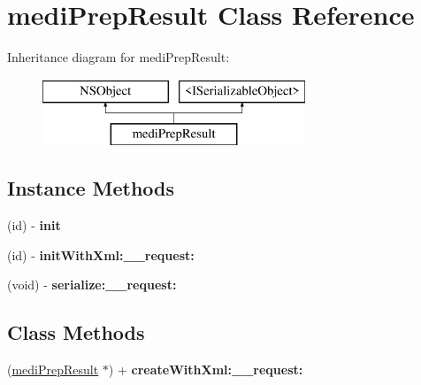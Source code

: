 \hypertarget{interfacemedi_prep_result}{}\section{medi\+Prep\+Result Class Reference}
\label{interfacemedi_prep_result}
Inheritance diagram for medi\+Prep\+Result\+:\begin{figure}[H]
\begin{center}
\leavevmode
\includegraphics[height=2.000000cm]{interfacemedi_prep_result}
\end{center}
\end{figure}
\subsection*{Instance Methods}
\begin{DoxyCompactItemize}
\item 
\hypertarget{interfacemedi_prep_result_a85012413eda0b554bc62a27576b581b4}{}(id) -\/ {\bfseries init}\label{interfacemedi_prep_result_a85012413eda0b554bc62a27576b581b4}

\item 
\hypertarget{interfacemedi_prep_result_a6b0ad188a925f75b083775bcba7aac48}{}(id) -\/ {\bfseries init\+With\+Xml\+:\+\_\+\+\_\+request\+:}\label{interfacemedi_prep_result_a6b0ad188a925f75b083775bcba7aac48}

\item 
\hypertarget{interfacemedi_prep_result_aadf2307fc653c13c6ae667be79595625}{}(void) -\/ {\bfseries serialize\+:\+\_\+\+\_\+request\+:}\label{interfacemedi_prep_result_aadf2307fc653c13c6ae667be79595625}

\end{DoxyCompactItemize}
\subsection*{Class Methods}
\begin{DoxyCompactItemize}
\item 
\hypertarget{interfacemedi_prep_result_ac6e1e58283cb9065982bff5217cf9e81}{}(\hyperlink{interfacemedi_prep_result}{medi\+Prep\+Result} $\ast$) + {\bfseries create\+With\+Xml\+:\+\_\+\+\_\+request\+:}\label{interfacemedi_prep_result_ac6e1e58283cb9065982bff5217cf9e81}

\end{DoxyCompactItemize}
